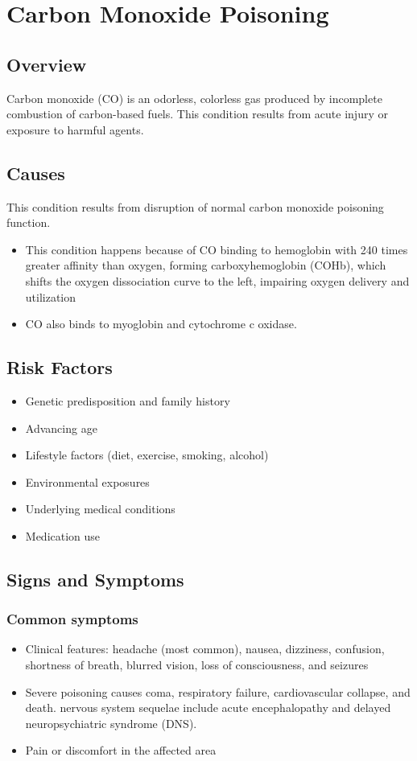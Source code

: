 \chapter{Carbon Monoxide Poisoning}
\label{sec:Carbon Monoxide Poisoning}

\section{Overview}
Carbon monoxide (CO) is an odorless, colorless gas produced by incomplete combustion of carbon-based fuels. This condition results from acute injury or exposure to harmful agents.
\section{Causes}
This condition results from disruption of normal carbon monoxide poisoning function.

\begin{itemize}[noitemsep]
  \item This condition happens because of CO binding to hemoglobin with 240 times greater affinity than oxygen, forming carboxyhemoglobin (COHb), which shifts the oxygen dissociation curve to the left, impairing oxygen delivery and utilization
  \item CO also binds to myoglobin and cytochrome c oxidase.
\end{itemize}
\section{Risk Factors}


\begin{itemize}[noitemsep]
  \item Genetic predisposition and family history
  \item Advancing age
  \item Lifestyle factors (diet, exercise, smoking, alcohol)
  \item Environmental exposures
  \item Underlying medical conditions
  \item Medication use
\end{itemize}
\section{Signs and Symptoms}

\subsection{Common symptoms}
\begin{itemize}[noitemsep]
  \item Clinical features: headache (most common), nausea, dizziness, confusion, shortness of breath, blurred vision, loss of consciousness, and seizures
  \item Severe poisoning causes coma, respiratory failure, cardiovascular collapse, and death. nervous system sequelae include acute encephalopathy and delayed neuropsychiatric syndrome (DNS).
  \item Pain or discomfort in the affected area
  \end{itemize}

